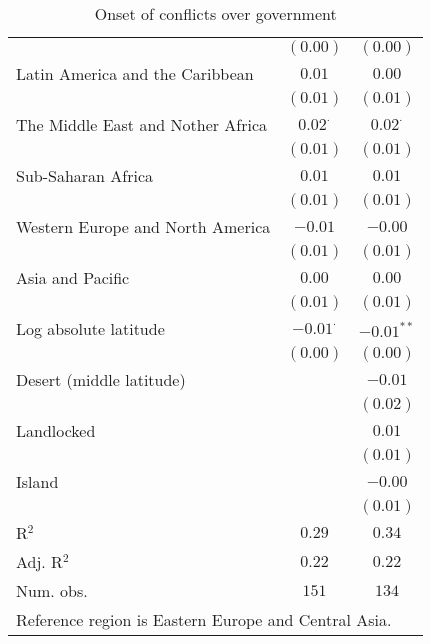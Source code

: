\begin{table}[H]
\begin{center}
{\begin{tabular}{l c c}
                                  & $(0.00)$        & $(0.00)$       \\
Latin America and the Caribbean   & $0.01$          & $0.00$         \\
                                  & $(0.01)$        & $(0.01)$       \\
The Middle East and Nother Africa & $0.02^{\cdot}$  & $0.02^{\cdot}$ \\
                                  & $(0.01)$        & $(0.01)$       \\
Sub-Saharan Africa                & $0.01$          & $0.01$         \\
                                  & $(0.01)$        & $(0.01)$       \\
Western Europe and North America  & $-0.01$         & $-0.00$        \\
                                  & $(0.01)$        & $(0.01)$       \\
Asia and Pacific                  & $0.00$          & $0.00$         \\
                                  & $(0.01)$        & $(0.01)$       \\
Log absolute latitude             & $-0.01^{\cdot}$ & $-0.01^{**}$   \\
                                  & $(0.00)$        & $(0.00)$       \\
Desert (middle latitude)          &                 & $-0.01$        \\
                                  &                 & $(0.02)$       \\
Landlocked                        &                 & $0.01$         \\
                                  &                 & $(0.01)$       \\
Island                            &                 & $-0.00$        \\
                                  &                 & $(0.01)$       \\
\hline
R$^2$                             & $0.29$          & $0.34$         \\
Adj. R$^2$                        & $0.22$          & $0.22$         \\
Num. obs.                         & $151$           & $134$          \\
\hline
\multicolumn{3}{l}{\scriptsize{Reference region is Eastern Europe and Central Asia.}}
\end{tabular}
}
\caption{Onset of conflicts over government}
\label{onsetgov}
\end{center}
\end{table}
